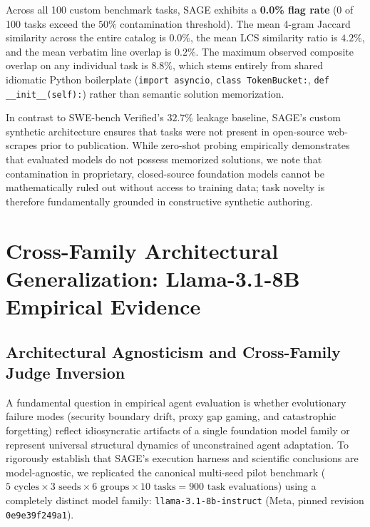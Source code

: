 \documentclass{article}
\begin{document}


Across all 100 custom benchmark tasks, SAGE exhibits a \textbf{0.0\% flag rate} (0 of 100 tasks exceed the $50\%$ contamination threshold). The mean 4-gram Jaccard similarity across the entire catalog is $0.0\%$, the mean LCS similarity ratio is $4.2\%$, and the mean verbatim line overlap is $0.2\%$. The maximum observed composite overlap on any individual task is $8.8\%$, which stems entirely from shared idiomatic Python boilerplate (\texttt{import asyncio}, \texttt{class TokenBucket:}, \texttt{def __init__(self):}) rather than semantic solution memorization.

In contrast to SWE-bench Verified's $32.7\%$ leakage baseline, SAGE's custom synthetic architecture ensures that tasks were not present in open-source web-scrapes prior to publication. While zero-shot probing empirically demonstrates that evaluated models do not possess memorized solutions, we note that contamination in proprietary, closed-source foundation models cannot be mathematically ruled out without access to training data; task novelty is therefore fundamentally grounded in constructive synthetic authoring.

\section{Cross-Family Architectural Generalization: Llama-3.1-8B Empirical Evidence}
\label{app:cross_family}

\subsection{Architectural Agnosticism and Cross-Family Judge Inversion}
A fundamental question in empirical agent evaluation is whether evolutionary failure modes (security boundary drift, proxy gap gaming, and catastrophic forgetting) reflect idiosyncratic artifacts of a single foundation model family or represent universal structural dynamics of unconstrained agent adaptation. To rigorously establish that SAGE's execution harness and scientific conclusions are model-agnostic, we replicated the canonical multi-seed pilot benchmark ($5\text{ cycles} \times 3\text{ seeds} \times 6\text{ groups} \times 10\text{ tasks} = 900\text{ task evaluations}$) using a completely distinct model family: \texttt{llama-3.1-8b-instruct} (Meta, pinned revision \texttt{0e9e39f249a1}).
\end{document}
